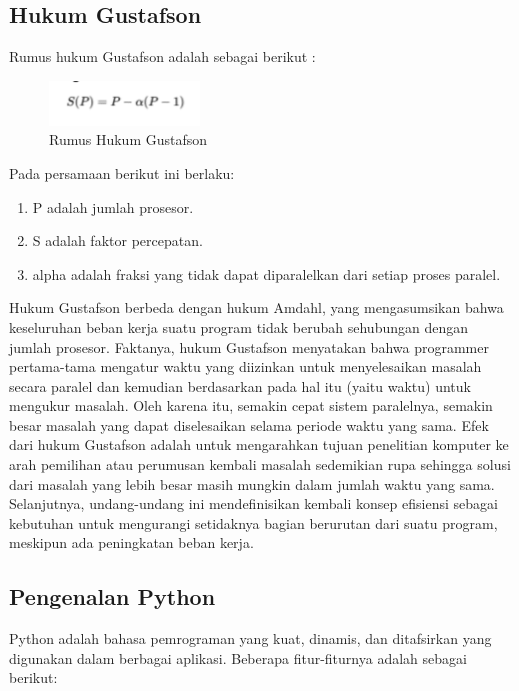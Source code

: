\subsection{Hukum Gustafson}
Rumus hukum Gustafson adalah sebagai berikut : 
\begin{figure}[H]
    \includegraphics[width=4cm]{figures/kelompok3/1/gustafson.png}
    \centering
    \caption{Rumus Hukum Gustafson}
\end{figure}
Pada persamaan berikut ini berlaku:
\begin{enumerate}
	\item P adalah jumlah prosesor.  
	\item S adalah faktor percepatan.  
	\item alpha adalah fraksi yang tidak dapat diparalelkan dari setiap proses paralel.
\end{enumerate}
Hukum Gustafson berbeda dengan hukum Amdahl, yang mengasumsikan bahwa keseluruhan beban kerja suatu program tidak berubah sehubungan dengan jumlah prosesor.
\hfill\break
Faktanya, hukum Gustafson menyatakan bahwa programmer pertama-tama mengatur waktu yang diizinkan untuk menyelesaikan masalah secara paralel dan kemudian berdasarkan pada hal itu (yaitu waktu) untuk mengukur masalah. Oleh karena itu, semakin cepat sistem paralelnya, semakin besar masalah yang dapat diselesaikan selama periode waktu yang sama.
\hfill\break
Efek dari hukum Gustafson adalah untuk mengarahkan tujuan penelitian komputer ke arah pemilihan atau perumusan kembali masalah sedemikian rupa sehingga solusi dari masalah yang lebih besar masih mungkin dalam jumlah waktu yang sama. Selanjutnya, undang-undang ini mendefinisikan kembali konsep efisiensi sebagai kebutuhan untuk mengurangi setidaknya bagian berurutan dari suatu program, meskipun ada peningkatan beban kerja.

\subsection{Pengenalan Python}
Python adalah bahasa pemrograman yang kuat, dinamis, dan ditafsirkan yang digunakan dalam berbagai aplikasi. Beberapa fitur-fiturnya adalah sebagai berikut:

